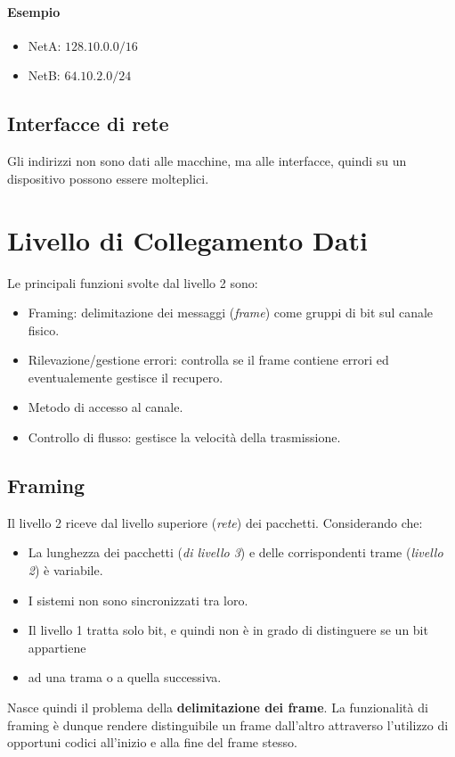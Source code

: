 \documentclass[oneside,a4paper,11pt]{book}
\theoremstyle{italicstyle}
\theoremstyle{normStyle}
\begin{document}
\paragraph*{Esempio}
\begin{itemize}
  \item NetA: $128.10.0.0/16$
  \item NetB: $64.10.2.0/24$
\end{itemize}
\subsection{Interfacce di rete}
Gli indirizzi non sono dati alle macchine, ma alle interfacce, quindi su 
un dispositivo possono essere molteplici. 
\section{Livello di Collegamento Dati}
Le principali funzioni svolte dal livello 2 sono:
\begin{itemize}
  \item Framing: delimitazione dei messaggi (\textit{frame}) come gruppi 
  di bit sul canale fisico.
  \item Rilevazione/gestione errori: controlla se il frame contiene errori ed 
  eventualemente gestisce il recupero.
  \item Metodo di accesso al canale.
  \item Controllo di flusso: gestisce la velocità della trasmissione.
\end{itemize}
\subsection{Framing}
Il livello 2 riceve dal livello superiore (\textit{rete}) dei pacchetti.
Considerando che:
\begin{itemize}
  \item La lunghezza dei pacchetti (\textit{di livello 3}) e delle corrispondenti 
  trame (\textit{livello 2}) è variabile.
  \item I sistemi non sono sincronizzati tra loro.
  \item Il livello 1 tratta solo bit, e quindi non è in grado di distinguere se un bit appartiene 
  \item ad una trama o a quella successiva.
\end{itemize}
Nasce quindi il problema della \textbf{delimitazione dei frame}. La 
funzionalità di framing è dunque rendere distinguibile un frame dall'altro attraverso 
l'utilizzo di opportuni codici all'inizio e alla fine del frame stesso.
\end{document}
